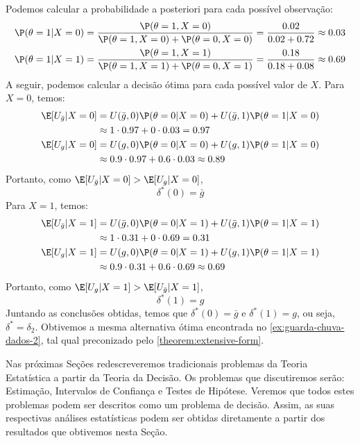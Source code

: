 \begin{example}
 Podemos calcular a probabilidade a posteriori para cada
 possível observação:
 \begin{align*}
  \P(\theta=1|X=0)
  &= \frac{\P(\theta=1,X=0)}
  {\P(\theta=1,X=0) + \P(\theta=0,X=0)}
  = \frac{0.02}{0.02 + 0.72} \approx 0.03 \\
  \P(\theta=1|X=1)
  &= \frac{\P(\theta=1,X=1)}
  {\P(\theta=1,X=1) + \P(\theta=0,X=1)}
  = \frac{0.18}{0.18 + 0.08} \approx 0.69 \\
 \end{align*}
 A seguir, podemos calcular a decisão ótima para
 cada possível valor de $X$. Para $X=0$, temos:
 \begin{align*}
  \E[U_{\bar{g}}|X=0]
  &= U(\bar{g},0)\P(\theta=0|X=0) +
  U(\bar{g},1)\P(\theta=1|X=0) \\
  &\approx 1 \cdot 0.97 + 0 \cdot 0.03 = 0.97 \\
  \E[U_{g}|X=0]
  &= U(g,0)\P(\theta=0|X=0) + U(g,1)\P(\theta=1|X=0) \\
  &\approx 0.9 \cdot 0.97 + 0.6 \cdot 0.03 \approx 0.89\\
 \end{align*}
 Portanto, como $\E[U_{\bar{g}}|X=0] > \E[U_{g}|X=0]$, 
 $$\delta^{*}(0) = \bar{g}$$
 Para $X=1$, temos:
 \begin{align*}
  \E[U_{\bar{g}}|X=1]
  &= U(\bar{g},0)\P(\theta=0|X=1)
  +U(\bar{g},1)\P(\theta=1|X=1) \\
  &\approx 1 \cdot 0.31 + 0 \cdot 0.69 = 0.31 \\
  \E[U_{g}|X=1]
  &= U(g,0)\P(\theta=0|X=1)
  +U(g,1)\P(\theta=1|X=1) \\
  &\approx 0.9 \cdot 0.31 + 0.6 \cdot 0.69
  \approx 0.69 \\				
 \end{align*}
 Portanto, como $\E[U_{g}|X=1] > \E[U_{\bar{g}}|X=1]$, 
 $$\delta^{*}(1) = g$$
 Juntando as conclusões obtidas, 
 temos que $\delta^{*}(0) = \bar{g}$ e
 $\delta^{*}(1) = g$, ou seja,
 $\delta^{*} = \delta_{2}$.
 Obtivemos a mesma alternativa ótima encontrada no
 \cref{ex:guarda-chuva-dados-2},
 tal qual preconizado pelo
 \cref{theorem:extensive-form}.
\end{example}

 Nas próximas Seções redescreveremos tradicionais
 problemas da Teoria Estatística a partir da
 Teoria da Decisão.
 Os problemas que discutiremos serão:
 Estimação, Intervalos de Confiança e Testes de Hipótese.
 Veremos que todos estes problemas podem ser descritos
 como um problema de decisão.
 Assim, as suas respectivas análises estatísticas
 podem ser obtidas diretamente a partir dos resultados
 que obtivemos nesta Seção.

